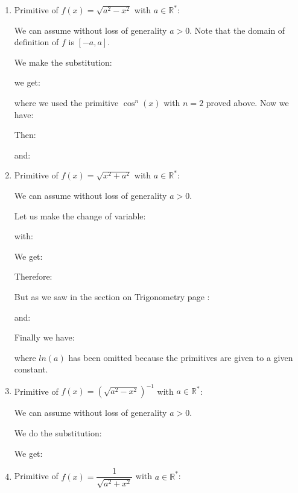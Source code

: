 \begin{enumerate}
		but () as:
		
		Therefore:
		
		and using another identity proved in the section Trigonometry:
		
		we have therefore:
		
		as the primitive are given to a given constant, we can write:
		
		for $x\geq a$. $F$ is then a primitive of $\sqrt{x^2-a^2}$ on the interval $[a,+\infty[$.
		
		\item Primitive of $f(x)=\sqrt{a^2-x^2}$ with $a\in \mathbb{R}^*$:
		
		We can assume without loss of generality $a>0$. Note that the domain of definition of $f$ is $[-a, a]$.
		
		We make the substitution:
		
		we get:
		
		where we used the primitive $\cos^n (x)$ with $n=2$ proved above. Now we have:
		
		Then:
		
		and:
		

		\item Primitive of $f(x)=\sqrt{x^2+a^2}$ with $a\in \mathbb{R}^*$:
		
		We can assume without loss of generality $a>0$.
		
		Let us make the change of variable:
		
		with:
		
		We get:
		
		Therefore:
		
		But as we saw in the section on Trigonometry page \pageref{hyperbolic trigonometry}:
		
		and:
		
		Finally we have:
		
		where $ln (a)$ has been omitted because the primitives are given to a given constant.
		
		\item Primitive of $f(x)=\left(\sqrt{a^2-x^2}\right)^{-1}$ with $a\in \mathbb{R}^*$:
		
		We can assume without loss of generality $a>0$.
		
		We do the substitution:
		
		We get:
		
		
		\item Primitive of $f(x)=\dfrac{1}{\sqrt{a^2+x^2}}$ with $a\in \mathbb{R}^*$:
		

\end{enumerate}
